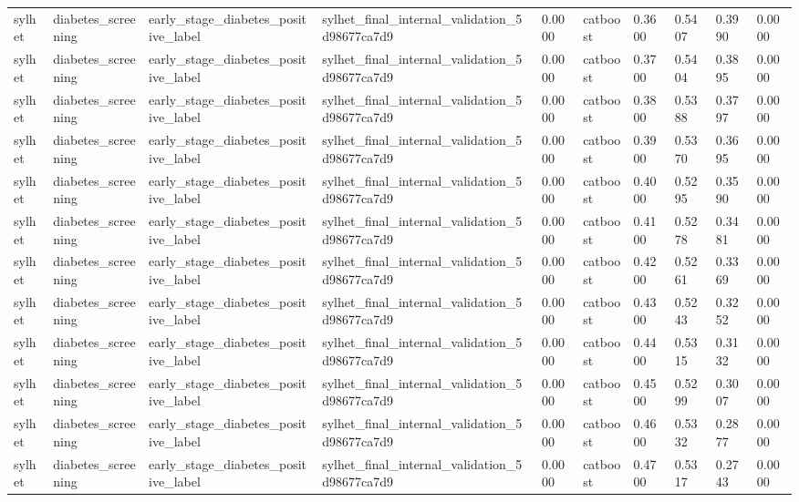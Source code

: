 \begin{tabular}{llllllllll}
sylhet & diabetes\_screening & early\_stage\_diabetes\_positive\_label & sylhet\_final\_internal\_validation\_5d98677ca7d9 & 0.0000 & catboost & 0.3600 & 0.5407 & 0.3990 & 0.0000 \\
sylhet & diabetes\_screening & early\_stage\_diabetes\_positive\_label & sylhet\_final\_internal\_validation\_5d98677ca7d9 & 0.0000 & catboost & 0.3700 & 0.5404 & 0.3895 & 0.0000 \\
sylhet & diabetes\_screening & early\_stage\_diabetes\_positive\_label & sylhet\_final\_internal\_validation\_5d98677ca7d9 & 0.0000 & catboost & 0.3800 & 0.5388 & 0.3797 & 0.0000 \\
sylhet & diabetes\_screening & early\_stage\_diabetes\_positive\_label & sylhet\_final\_internal\_validation\_5d98677ca7d9 & 0.0000 & catboost & 0.3900 & 0.5370 & 0.3695 & 0.0000 \\
sylhet & diabetes\_screening & early\_stage\_diabetes\_positive\_label & sylhet\_final\_internal\_validation\_5d98677ca7d9 & 0.0000 & catboost & 0.4000 & 0.5295 & 0.3590 & 0.0000 \\
sylhet & diabetes\_screening & early\_stage\_diabetes\_positive\_label & sylhet\_final\_internal\_validation\_5d98677ca7d9 & 0.0000 & catboost & 0.4100 & 0.5278 & 0.3481 & 0.0000 \\
sylhet & diabetes\_screening & early\_stage\_diabetes\_positive\_label & sylhet\_final\_internal\_validation\_5d98677ca7d9 & 0.0000 & catboost & 0.4200 & 0.5261 & 0.3369 & 0.0000 \\
sylhet & diabetes\_screening & early\_stage\_diabetes\_positive\_label & sylhet\_final\_internal\_validation\_5d98677ca7d9 & 0.0000 & catboost & 0.4300 & 0.5243 & 0.3252 & 0.0000 \\
sylhet & diabetes\_screening & early\_stage\_diabetes\_positive\_label & sylhet\_final\_internal\_validation\_5d98677ca7d9 & 0.0000 & catboost & 0.4400 & 0.5315 & 0.3132 & 0.0000 \\
sylhet & diabetes\_screening & early\_stage\_diabetes\_positive\_label & sylhet\_final\_internal\_validation\_5d98677ca7d9 & 0.0000 & catboost & 0.4500 & 0.5299 & 0.3007 & 0.0000 \\
sylhet & diabetes\_screening & early\_stage\_diabetes\_positive\_label & sylhet\_final\_internal\_validation\_5d98677ca7d9 & 0.0000 & catboost & 0.4600 & 0.5332 & 0.2877 & 0.0000 \\
sylhet & diabetes\_screening & early\_stage\_diabetes\_positive\_label & sylhet\_final\_internal\_validation\_5d98677ca7d9 & 0.0000 & catboost & 0.4700 & 0.5317 & 0.2743 & 0.0000 \\

\end{tabular}
